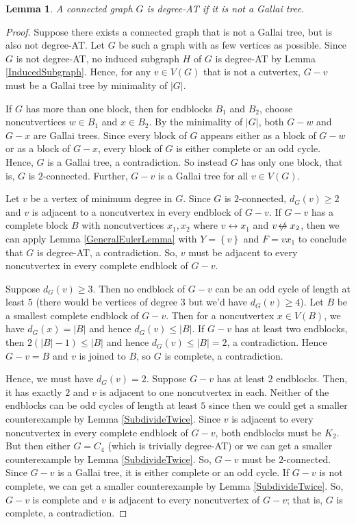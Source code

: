 \documentclass[12pt]{article}
\theoremstyle{plain}
\newtheorem{lem}[thm]{Lemma}
\theoremstyle{definition}
\theoremstyle{remark}
\newcommand{\set}[1]{\left\{ #1 \right\}}
\def\adj{\leftrightarrow}
\def\nonadj{\not\!\leftrightarrow}
\def\adj{\leftrightarrow}
\begin{document}
\begin{lem}\label{DegreeATClassification}
	A connected graph $G$ is degree-AT if it is not a Gallai tree.
\end{lem}
\begin{proof}
	Suppose there exists a connected graph that is not a Gallai tree, but is also not
	degree-AT.  Let $G$ be such a graph with as few vertices as possible.
	Since $G$ is not degree-AT, no induced subgraph $H$ of $G$ is
	degree-AT by Lemma \ref{InducedSubgraph}. 
	Hence, for any $v \in V(G)$ that is not a cutvertex, $G-v$ must be a Gallai
	tree by minimality of $|G|$.  
	
	If $G$ has more than one block, then for endblocks $B_1$ and $B_2$, choose
	noncutvertices $w\in B_1$ and $x\in B_2$.  By the minimality of $|G|$, both
	$G-w$ and $G-x$ are Gallai trees.  Since every block of $G$ appears either as a
	block of $G-w$ or as a block of $G-x$, every block of $G$ is either complete or
	an odd cycle.  Hence, $G$ is a Gallai tree, a contradiction.  So instead $G$
	has only one block, that is, $G$ is $2$-connected.  Further, $G-v$ is a Gallai
	tree for all $v \in V(G)$.
	
	Let $v$ be a vertex of minimum degree in $G$.  Since $G$ is $2$-connected, $d_G(v) \ge 2$ and $v$ is adjacent to a noncutvertex in every endblock of $G-v$.
	If $G-v$ has a complete block $B$ with noncutvertices $x_1,x_2$ where $v \adj x_1$ and $v \nonadj x_2$, then we can apply Lemma \ref{GeneralEulerLemma} with $Y = \set{v}$ and $F = vx_1$ to conclude that $G$ is degree-AT, a contradiction.  So, $v$ must be adjacent to every noncutvertex in every complete endblock of $G-v$.
	
	Suppose $d_G(v) \ge 3$.  Then no endblock of $G-v$ can be an odd cycle of length at least $5$ (there would be vertices of degree $3$ but we'd have $d_G(v) \ge 4$).  Let $B$ be a smallest complete endblock of $G-v$.  Then for a noncutvertex $x \in V(B)$, we have $d_G(x) = |B|$ and hence $d_G(v) \le |B|$.  If $G-v$ has at least two endblocks, then $2(|B|-1) \le |B|$ and hence $d_G(v) \le |B| = 2$, a contradiction.  Hence $G-v = B$ and $v$ is joined to $B$, so $G$ is complete, a contradiction.
	
	Hence, we must have $d_G(v) = 2$.  Suppose $G-v$ has at least $2$ endblocks.  Then, it has exactly $2$ and $v$ is adjacent to one noncutvertex in each.  Neither of the endblocks can be odd cycles of length at least $5$ since then we could get a smaller counterexample by Lemma \ref{SubdivideTwice}.  Since $v$ is adjacent to every noncutvertex in every complete endblock of $G-v$, both endblocks must be $K_2$.  But then either $G=C_4$ (which is trivially degree-AT) or we can get a smaller counterexample by Lemma \ref{SubdivideTwice}.  So, $G-v$ must be $2$-connected. Since $G-v$ is a Gallai tree, it is either complete or an odd cycle.  If $G-v$ is not complete, we can get a smaller counterexample by Lemma \ref{SubdivideTwice}.  So, $G-v$ is complete and $v$ is adjacent to every noncutvertex of $G-v$; that is, $G$ is complete, a contradiction.
\end{proof}
\end{document}
